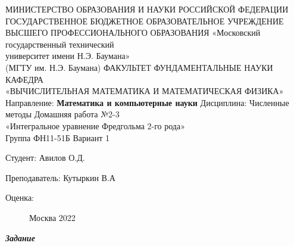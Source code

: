 \documentclass[12pt]{article}
\begin{document}
	
	\begin{center}
		МИНИСТЕРСТВО ОБРАЗОВАНИЯ И НАУКИ РОССИЙСКОЙ ФЕДЕРАЦИИ \\ ГОСУДАРСТВЕННОЕ БЮДЖЕТНОЕ ОБРАЗОВАТЕЛЬНОЕ УЧРЕЖДЕНИЕ \\ 
		ВЫСШЕГО ПРОФЕССИОНАЛЬНОГО ОБРАЗОВАНИЯ
		\vskip 1.5cm
		«Московский государственный технический \\
		университет имени Н.Э. Баумана» \\
		(МГТУ им. Н.Э. Баумана)
		\vskip 1.5cm
		ФАКУЛЬТЕТ ФУНДАМЕНТАЛЬНЫЕ НАУКИ \\
		КАФЕДРА \\
		«ВЫЧИСЛИТЕЛЬНАЯ МАТЕМАТИКА И МАТЕМАТИЧЕСКАЯ ФИЗИКА»
		\vskip 0.4cm
		Направление: \textbf{Математика и компьютерные науки}
		\vskip 0.4cm
		Дисциплина: Численные методы
		\vskip 0.4cm
		Домашняя работа №2-3 \\
		«Интегральное уравнение Фредгольма 2-го рода» \\
	Группа ФН11-51Б
	\vskip 0.2cm
	Вариант 1
	
	
	\vskip 1.5cm
	\begin{flushright}
		Студент: Авилов О.Д.
		
		\vskip 1.5cm
		
		Преподаватель: Кутыркин В.А
	\end{flushright}
	Оценка:
	
	\begin{figure}[b]
		\begin{center}
			Москва 2022
		\end{center}
	\end{figure}
	
\end{center}
	
	\newpage
\begin{center}
	\textbf{\textit{Задание}}
\end{center}
\end{document}
